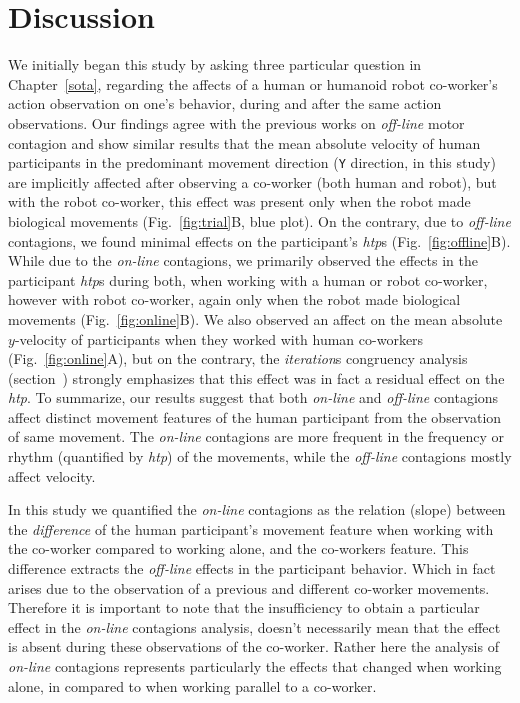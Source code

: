 \clearpage
\section{Discussion}


We initially began this study by asking three particular question in Chapter~\ref{sota}, regarding the affects of a human or humanoid robot co-worker's action observation on one's behavior, during and after the same action observations. Our findings agree with the previous works on \textit{off-line} motor contagion and show similar results that the mean absolute velocity of human participants in the predominant movement direction (\texttt{Y} direction, in this study) are implicitly affected after observing a co-worker (both human and robot), but with the robot co-worker, this effect was present only when the robot made biological movements (Fig.~\ref{fig:trial}B, blue plot). On the contrary, due to \textit{off-line} contagions, we found minimal effects on the participant's {\it htp}s (Fig.~\ref{fig:offline}B). While due to the \textit{on-line} contagions, we primarily observed the effects in the participant {\it htp}s during both, when working with a human or robot co-worker, however with robot co-worker, again only when the robot made biological movements (Fig.~\ref{fig:online}B). We also observed an affect on the mean absolute $y$-velocity of participants when they worked with human co-workers (Fig.~\ref{fig:online}A), but on the contrary, the \textit{iteration}s congruency analysis (section~) strongly emphasizes that this effect was in fact a residual effect on the {\it htp}. To summarize, our results suggest that both \textit{on-line} and \textit{off-line} contagions affect distinct movement features of the human participant from the observation of same movement. The \textit{on-line} contagions are more frequent in the frequency or rhythm (quantified by {\it htp}) of the movements, while the \textit{off-line} contagions mostly affect velocity.

In this study we quantified the \textit{on-line} contagions as the relation (slope) between the \textit{difference} of the human participant's movement feature when working with the co-worker compared to working alone, and the co-workers feature. This difference extracts the \textit{off-line} effects in the participant behavior. Which in fact arises due to the observation of a previous and different co-worker movements. Therefore it is important to note that the insufficiency to obtain a particular effect in the \textit{on-line} contagions analysis, doesn't necessarily mean that the effect is absent during these observations of the co-worker. Rather here the analysis of \textit{on-line} contagions represents particularly the effects that changed when working alone, in compared to when working parallel to a co-worker.

